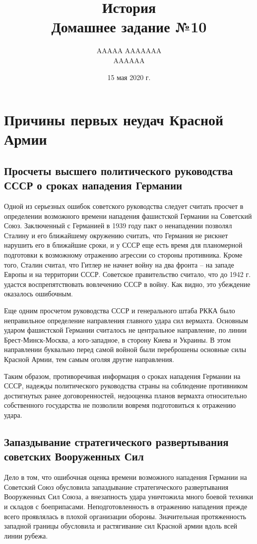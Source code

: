 \documentclass[12pt]{article}
\title{История \\ Домашнее задание №10}
\author{AAAAA AAAAAAA \\ AAAAAA}
\date{15 мая 2020 г.}
\begin{document}
  \maketitle

  \setcounter{section}{1}
  \section{Причины первых неудач Красной Армии}
  \subsection{Просчеты высшего политического руководства СССР о сроках нападения Германии}
  Одной из серьезных ошибок советского руководства следует считать просчет
  в определении возможного времени нападения фашистской Германии на Советский Союз.
  Заключенный с Германией в 1939 году пакт о ненападении позволял Сталину и его ближайшему окружению считать,
  что Германия не рискнет нарушить его в ближайшие сроки,
  и у СССР еще есть время для планомерной подготовки к возможному отражению агрессии со стороны противника.
  Кроме того, Сталин считал, что Гитлер не начнет войну на два фронта -- на западе Европы и на территории СССР.
  Советское правительство считало, что до 1942 г. удастся воспрепятствовать вовлечению СССР в войну.
  Как видно, это убеждение оказалось ошибочным.

  Еще одним просчетом руководства СССР и генерального штаба РККА было неправильное определение направления главного удара сил вермахта.
  Основным ударом фашистской Германии считалось не центральное направление, по линии Брест-Минск-Москва,
  а юго-западное, в сторону Киева и Украины.
  В этом направлении буквально перед самой войной были переброшены основные силы Красной Армии, тем самым оголяя другие направления.

  Таким образом, противоречивая информация о сроках нападения Германии на СССР, надежды политического руководства страны на соблюдение противником достигнутых ранее договоренностей, недооценка планов вермахта относительно собственного государства не позволили вовремя подготовиться к отражению удара.

  \subsection{Запаздывание стратегического развертывания советских Вооруженных Сил}
  Дело в том, что ошибочная оценка времени возможного нападения Германии на Советский Союз обусловила запаздывание стратегического развертывания Вооруженных Сил Союза, а внезапность удара уничтожила много боевой техники и складов с боеприпасами.
  Неподготовленность в отражению нападения прежде всего проявлялась в плохой организации обороны.
  Значительная протяженность западной границы обусловила и растягивание сил Красной армии вдоль всей линии рубежа.
\end{document}
